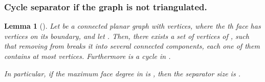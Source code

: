 \documentclass[12pt]{article}
\newtheorem{lemma}[theorem]{Lemma}
\theoremstyle{remark}\theoremheaderfont{\sf}\theorembodyfont{\upshape}\newtheorem{defn}[theorem]{Definition}
\newcommand{\lemlab}[1]{\label{lemma:#1}}
\renewcommand{\th}{th\xspace}
\begin{document}
\subsubsection{Cycle separator if the graph is not triangulated.}


\begin{lemma}[\cite{m-fsscs-86}]
    \lemlab{separator:2:x}Let  be a connected planar graph with
     vertices, where the \th face has  vertices on its
    boundary, and let .  Then, there exists a set
     of  vertices of , such that removing
     from  breaks it into several connected components,
    each one of them contains at most  vertices. Furthermore
     is a cycle in .

    In particular, if the maximum face degree in  is , then
    the separator size is .
\end{lemma}
\end{document}
